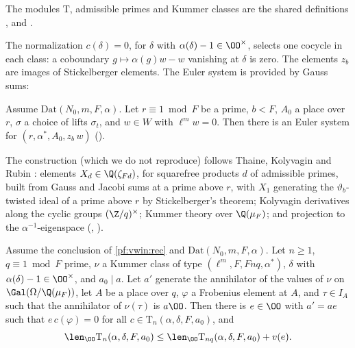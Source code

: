 The modules $\mathrm{T}$, admissible primes and Kummer classes are the shared definitions ,
 and .

The normalization $c(\delta)=0$, for $\delta$ with $\alpha(\delta)-1\in\OO^\times$, selects one cocycle in each class: a coboundary
$g\mapsto\alpha(g)w-w$ vanishing at $\delta$ is zero. The elements $z_b$ are images of Stickelberger elements. The Euler system is
provided by Gauss sums:

\begin{proposition}\label{pf:vwin:nusys}
Assume $\mathrm{Dat}(N_0,m,F,\alpha)$. Let $r\equiv1\bmod F$ be a prime, $b<F$, $A_0$ a place over $r$, $\sigma$ a choice of lifts
$\sigma_t$, and $w\in W$ with $\ell^mw=0$. Then there is an Euler system for $(r,\alpha^*,A_0,z_b\,w)$
().
\end{proposition}

The construction (which we do not reproduce) follows Thaine, Kolyvagin and Rubin \cite{Thaine1988,Kolyvagin1990,Rubin1990}: elements
$X_d\in\Q(\zeta_{Fd})$, for squarefree products $d$ of admissible primes, built from Gauss and Jacobi sums at a prime above $r$, with
$X_1$ generating the $\vartheta_b$-twisted ideal of a prime above $r$ by Stickelberger's theorem; Kolyvagin derivatives along the cyclic
groups $(\Z/q)^\times$; Kummer theory over $\Q(\mu_F)$; and projection to the $\alpha^{-1}$-eigenspace (,
).

\begin{lemma}\label{pf:vwin:key}
Assume the conclusion of \cref{pf:vwin:rec} and $\mathrm{Dat}(N_0,m,F,\alpha)$. Let $n\ge1$, $q\equiv1\bmod F$ prime, $\nu$ a Kummer class of type
$(\ell^m,F,Fnq,\alpha^*)$, $\delta$ with $\alpha(\delta)-1\in\OO^\times$, and $a_0\mid a$. Let $a'$ generate the annihilator of the values of $\nu$
on $\Gal(\Omega/\Q(\mu_F))$, let $A$ be a place over $q$, $\varphi$ a Frobenius element at $A$, and $\tau\in I_A$ such that the annihilator of
$\nu(\tau)$ is $a\OO$. Then there is $e\in\OO$ with $a'=ae$ such that $e\,c(\varphi)=0$ for all $c\in\mathrm{T}_n(\alpha,\delta,F,a_0)$, and
\[
 \len_\OO\mathrm{T}_n(\alpha,\delta,F,a_0)\le\len_\OO\mathrm{T}_{nq}(\alpha,\delta,F,a_0)+v(e).
\]
\end{lemma}

